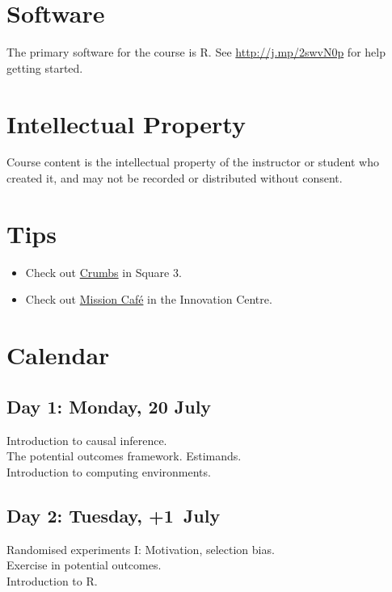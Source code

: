 \documentclass[11pt]{article}
\newcommand{\firstdate}{20 }
\begin{document}
\section*{Software}

The primary software for the course is R. See \href{http://www.ryantmoore.org/files/class/introPolResearch/intro_R_short.pdf}{http://j.mp/2swvN0p}
for help getting started.

\section*{Intellectual Property}
Course content is the intellectual property of the instructor or student who created 
it, and may not be recorded or distributed without consent.

\section*{Tips}

\begin{itemize}
\item Check out \href{https://www.essex.ac.uk/staff/food-and-drink/crumbs}{Crumbs} in Square 3.
\item Check out \href{https://www.mission-cafe.co.uk}{Mission Café} in the Innovation Centre.
\end{itemize}

\section*{Calendar}
\renewcommand{\labelitemi}{$\square$}

\subsection*{Day 1: Monday, \firstdate July}

	Introduction to causal inference.\\
	The potential outcomes framework. Estimands.\\
	Introduction to computing environments. 

\subsection*{Day 2: Tuesday, \the\numexpr\firstdate+1\relax~July}

Randomised experiments I: Motivation, selection bias.\\
Exercise in potential outcomes.\\
Introduction to R.\\
\end{document}
